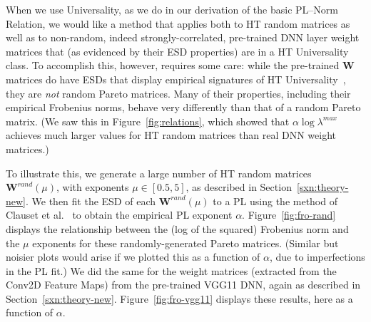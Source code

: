 {When we use Universality, as we do in our derivation of 
the basic PL--Norm Relation, 
we would like a method that applies both to HT random matrices as well as to non-random, indeed strongly-correlated, pre-trained DNN layer weight matrices that (as evidenced by their ESD properties) are in a HT Universality class.  
To accomplish this, however, requires some care: while the pre-trained $\mathbf{W}$ matrices do have ESDs that display empirical signatures of HT Universality~\cite{MM18_TR}, they are \emph{not} random Pareto matrices.
Many of their properties, including their empirical Frobenius norms, behave very differently than that of a random Pareto matrix.  
(We saw this in Figure~\ref{fig:relations}, which showed that $ \alpha\log\lambda^{max} $ achieves much larger values for HT random matrices than real DNN weight matrices.)

To illustrate this, we generate a large number of HT random matrices $\mathbf{W}^{rand}(\mu)$, with exponents $\mu\in[0.5, 5]$, as described in Section~\ref{sxn:theory-new}.
%
We then fit the ESD of each $\mathbf{W}^{rand}(\mu)$ to a PL using the method of Clauset et al.~\cite{CSN09_powerlaw,ABP14} to obtain the empirical PL exponent $\alpha$. 
Figure~\ref{fig:fro-rand} displays the relationship between the (log of the squared) Frobenius norm and the $\mu$ exponents for these randomly-generated Pareto matrices.
(Similar but noisier plots would arise if we plotted this as a function of $\alpha$, due to imperfections in the PL fit.)
We did the same for the weight matrices (extracted from the Conv2D Feature Maps) from the pre-trained VGG11 DNN, again as described in Section~\ref{sxn:theory-new}.
Figure~\ref{fig:fro-vgg11} displays these results, here as a function of $\alpha$.

}
